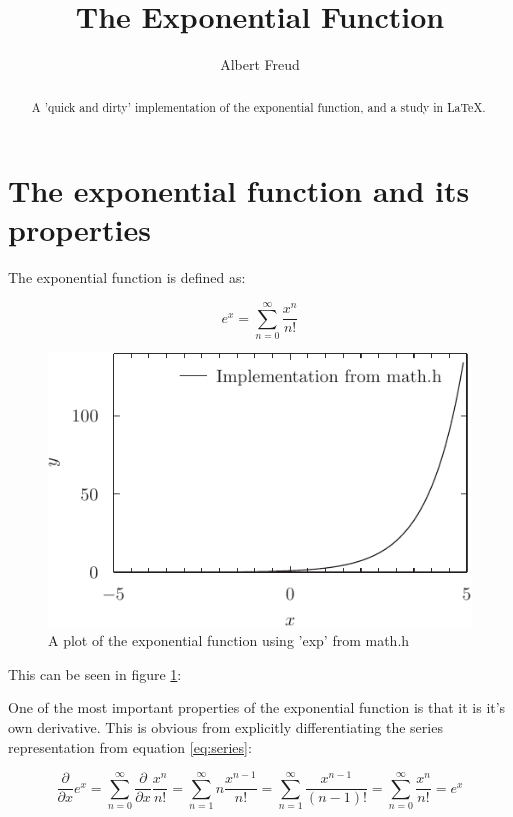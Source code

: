 \documentclass{article}
\begin{document}
\lstset{language=C}

\title{The Exponential Function}
\author{Albert Freud}
\maketitle

\begin{abstract}
A 'quick and dirty' implementation of the exponential function, and a study in \LaTeX.
\end{abstract}
\section{The exponential function and its properties}
The exponential function is defined as:

\begin{equation}
e^{x} = \sum_{n=0}^{\infty} \frac{x^n}{n!}
\label{eq:series}
\end{equation}

\begin{figure}\label{fig:true}
	\includegraphics{true_exp_plot.pdf}
	\caption{A plot of the exponential function using 'exp' from math.h}
\end{figure}
This can be seen in figure \ref{fig:true}:

One of the most important properties of the exponential function is that it is it's own derivative. This is obvious from explicitly differentiating the series representation from equation \ref{eq:series}:

\begin{equation}
	\frac{\partial}{\partial x} e^{x} = \sum_{n=0}^{\infty} \frac{\partial}{\partial x} \frac{x^n}{n!}
	=
	\sum_{n=1}^{\infty} n \frac{x^{n-1}}{n!}
	=
	\sum_{n=1}^{\infty} \frac{x^{n-1}}{(n-1)!}
	=
	\sum_{n=0}^{\infty} \frac{x^n}{n!}=e^{x}
\end{equation}
\end{document}
